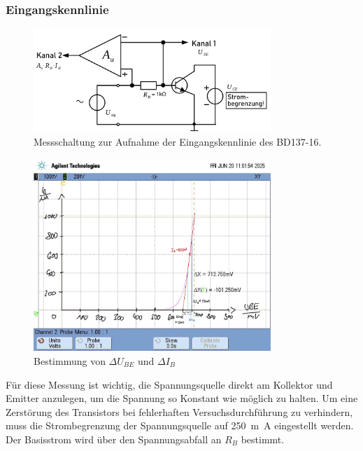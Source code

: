 \documentclass[
	a4paper, %
	12pt, %
]{CSUniSchoolLabReport}
\newcommand{\milli}{m}
\begin{document}
\subsubsection{Eingangskennlinie}
\begin{figure}[H]
	\centering
	\includegraphics[width=0.8\textwidth]{Figures/MessschaltungEingangskennlinie.png}
	\caption{Messschaltung zur Aufnahme der Eingangskennlinie des BD137-16.}
	\label{fig:MessschaltungEingangskennlinie}
\end{figure}
\begin{figure}[H]
	\centering
	\includegraphics[width=0.8\textwidth]{Figures/Eingangskennlinie.jpg}
	\caption{Bestimmung von $\Delta U_{BE}$ und $\Delta I_B$}
	\label{fig:Eingangskennlinie}
\end{figure}



Für diese Messung ist wichtig, die Spannungsquelle direkt am Kollektor und Emitter anzulegen, um die Spannung so Konstant wie möglich zu halten.
Um eine Zerstörung des Transistors bei fehlerhaften Versuchsdurchführung zu verhindern, muss die Strombegrenzung der Spannungsquelle auf \SI{250}{\milli\ampere} eingestellt werden. 
Der Basisstrom wird über den Spannungsabfall an $R_B$ bestimmt.
\end{document}
